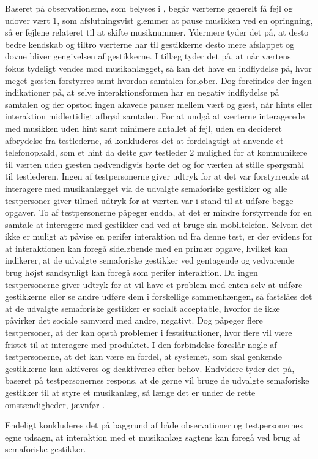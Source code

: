 Baseret på observationerne, som belyses i , begår værterne generelt få fejl og udover vært 1, som afslutningsvist glemmer at pause musikken ved en opringning, så er fejlene relateret til at skifte musiknummer. Ydermere tyder det på, at desto bedre kendskab og tiltro værterne har til gestikkerne desto mere afslappet og dovne bliver gengivelsen af gestikkerne. I tillæg tyder det på, at når værtens fokus tydeligt vendes mod musikanlægget, så kan det have en indflydelse på, hvor meget gæsten forstyrres samt hvordan samtalen forløber. Dog forefindes der ingen indikationer på, at selve interaktionsformen har en negativ indflydelse på samtalen og der opstod ingen akavede pauser mellem vært og gæst, når hints eller interaktion midlertidigt afbrød samtalen. For at undgå at værterne interagerede med musikken uden hint samt minimere antallet af fejl, uden en decideret afbrydelse fra testlederne, så konkluderes det at fordelagtigt at anvende et telefonopkald, som et hint da dette gav testleder 2 mulighed for at kommunikere til værten uden gæsten nødvendigvis hørte det og for værten at stille spørgsmål til testlederen.\blankline
%
Ingen af testpersonerne giver udtryk for at det var forstyrrende at interagere med musikanlægget via de udvalgte semaforiske gestikker og alle testpersoner giver tilmed udtryk for at værten var i stand til at udføre begge opgaver. To af testpersonerne påpeger endda, at det er mindre forstyrrende for en samtale at interagere med gestikker end ved at bruge sin mobiltelefon. Selvom det ikke er muligt at påvise en perifer interaktion ud fra denne test, er der evidens for at interaktionen kan foregå sideløbende med en primær opgave, hvilket kan indikerer, at de udvalgte semaforiske gestikker ved gentagende og vedvarende brug højst sandsynligt kan foregå som perifer interaktion. \blankline
%
Da ingen testpersonerne giver udtryk for at vil have et problem med enten selv at udføre gestikkerne eller se andre udføre dem i forskellige sammenhængen, så fastslåes det at de udvalgte semaforiske gestikker er socialt acceptable, hvorfor de ikke påvirker det sociale samværd med andre, negativt. Dog påpeger flere testpersoner, at der kan opstå problemer i festsituationer, hvor flere vil være fristet til at interagere med produktet. I den forbindelse foreslår nogle af testpersonerne, at det kan være en fordel, at systemet, som skal genkende gestikkerne kan aktiveres og deaktiveres efter behov. Endvidere tyder det på, baseret på testpersonernes respons, at de gerne vil bruge de udvalgte semaforiske gestikker til at styre et musikanlæg, så længe det er under de rette omstændigheder, jævnfør .  

Endeligt konkluderes det på baggrund af både observationer og testpersonernes egne udsagn, at interaktion med et musikanlæg sagtens kan foregå ved brug af semaforiske gestikker.



